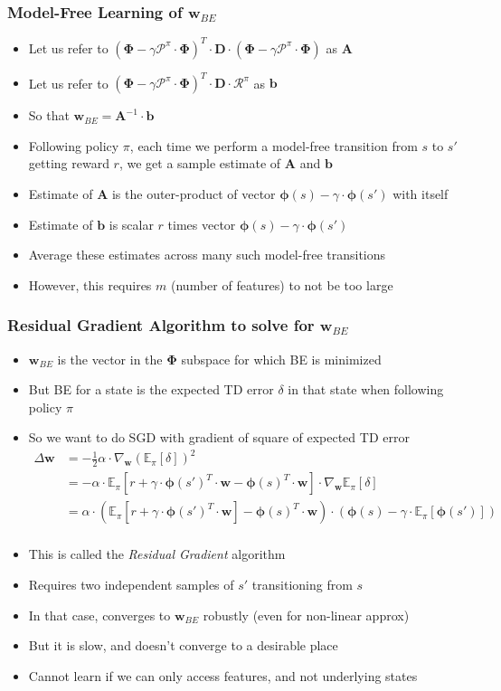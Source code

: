 \documentclass[handout]{beamer}
\newcommand{\bphi}{\bm{\Phi}}
\newcommand{\bd}{\bm{D}}
\newcommand{\bw}{\bm{w}}
\newcommand{\brew}{\bm{\mathcal{R}}^{\pi}}
\newcommand{\bprob}{\bm{\mathcal{P}}^{\pi}}
\begin{document}
\begin{frame}
\frametitle{Model-Free Learning of $\bm{w}_{BE}$}
\pause
\begin{itemize}[<+->]
\item Let us refer to $(\bphi - \gamma \bprob \cdot \bphi)^T \cdot \bd \cdot (\bphi - \gamma \bprob \cdot \bphi)$ as $\bm{A}$
\item Let us refer to $(\bphi - \gamma \bprob \cdot \bphi)^T \cdot \bd \cdot \brew$ as $\bm{b}$ 
\item So that $\bm{w}_{BE} = \bm{A}^{-1} \cdot \bm{b}$
\item Following policy $\pi$, each time we perform a model-free transition from $s$ to $s'$ getting reward $r$, we get a sample estimate of $\bm{A}$ and $\bm{b}$
\item Estimate of $\bm{A}$ is the outer-product of vector $\bm{\phi}(s) - \gamma \cdot \bm{\phi}(s')$ with itself
\item Estimate of $\bm{b}$ is scalar $r$ times vector $\bm{\phi}(s) - \gamma \cdot \bm{\phi}(s')$ 
\item Average these estimates across many such model-free transitions
\item However, this requires $m$ (number of features) to not be too large
\end{itemize}
\end{frame}


\begin{frame}
\frametitle{Residual Gradient Algorithm to solve for $\bm{w}_{BE}$}
\pause
\begin{itemize}[<+->]
\item $\bm{w}_{BE}$ is the vector in the $\bphi$ subspace for which BE is minimized
\item But BE for a state is the expected TD error $\delta$ in that state when following policy $\pi$
\item So we want to do SGD with gradient of square of expected TD error
\begin{align*}
\Delta \bw & = - \frac{1}{2} \alpha \cdot \nabla_{\bw} (\mathbb{E}_{\pi}[\delta])^2\\
& = - \alpha \cdot \mathbb{E}_{\pi}[r + \gamma \cdot \bm{\phi}(s')^T \cdot \bw - \bm{\phi}(s)^T \cdot \bw] \cdot \nabla_{\bw} \mathbb{E}_{\pi}[\delta]\\
& = \alpha \cdot (\mathbb{E}_{\pi}[r + \gamma \cdot \bm{\phi}(s')^T \cdot \bw] - \bm{\phi}(s)^T \cdot \bw) \cdot (\bm{\phi}(s) - \gamma \cdot \mathbb{E}_{\pi}[\bm{\phi}(s')])\\
\end{align*}
\item  This is called the {\em Residual Gradient} algorithm
\item Requires two independent samples of $s'$ transitioning from $s$
\item In that case, converges to $\bm{w}_{BE}$ robustly (even for non-linear approx)
\item But it is slow, and doesn't converge to a desirable place
\item Cannot learn if we can only access features, and not underlying states
\end{itemize}
\end{frame}
\end{document}
